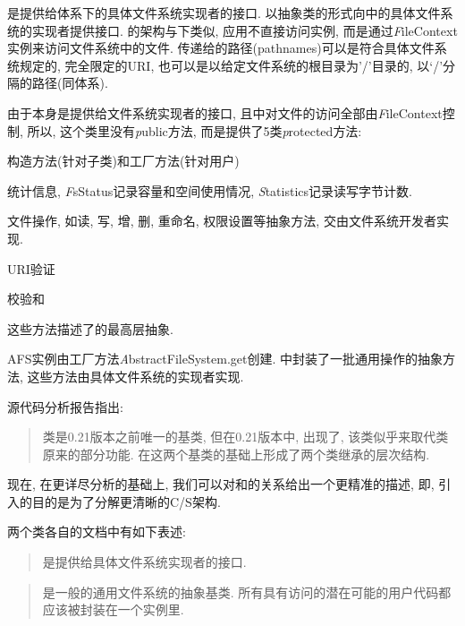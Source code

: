 {\AbsFS}是提供给{\HadoopFS}体系下的具体文件系统实现者的接口.
{\AbsFS}以抽象类的形式向{\HadoopFS}中的具体文件系统的实现者提供接口.
{\HadoopFS}的架构与{\Unix}下{\VFS}类似,
应用不直接访问{\AbsFS}实例, 而是通过{\emph FileContext}实例来访问文件系统中的文件.
传递给{\AbsFS}的路径(pathnames)可以是符合具体文件系统规定的, 完全限定的URI,
也可以是以给定文件系统的根目录为'/'目录的, 以‘/’分隔的路径(同{\Unix}体系).

由于{\AbsFS}本身是提供给文件系统实现者的接口,
且{\HadoopFS}中对文件的访问全部由{\emph FileContext}控制,
所以, 这个类里没有{\emph public}方法, 而是提供了5类{\emph protected}方法:

\begin{XeEnum}
    \item 构造方法(针对子类)和工厂方法(针对用户)
    \item 统计信息, {\emph FsStatus}记录容量和空间使用情况,
          {\emph Statistics}记录读写字节计数.
    \item 文件操作, 如读, 写, 增, 删, 重命名, 权限设置等抽象方法, 交由文件系统开发者实现.
    \item URI验证
    \item 校验和
\end{XeEnum}

这些方法描述了{\HadoopFS}的最高层抽象.

AFS实例由工厂方法{\emph AbstractFileSystem.get}创建.
{\AFS}中封装了一批通用操作的抽象方法, 这些方法由具体文件系统的实现者实现.

{\emph \Hadoop 源代码分析报告}指出:

\begin{quote}
    {\FiS}类是0.21版本之前唯一的基类, 但在0.21版本中, 出现了{\AbsFS},
    该类似乎来取代{\FiS}类原来的部分功能. 在这两个基类的基础上形成了两个类继承的层次结构.
\end{quote}

现在, 在更详尽分析的基础上,
我们可以对{\FiS}和{\AFS}的关系给出一个更精准的描述,
即, 引入{\AFS}的目的是为了分解更清晰的C/S架构.

两个类各自的文档中有如下表述:

\begin{quote}
    {\AbsFS}是提供给具体文件系统实现者的接口.
\end{quote}

\begin{quote}
    {\FiS}是一般的通用文件系统的抽象基类.
    所有具有访问{\HDFS}的潜在可能的用户代码都应该被封装在一个{\FiS}实例里.
\end{quote}

